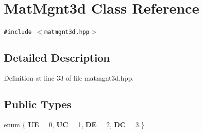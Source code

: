 \section{Mat\-Mgnt3d Class Reference}
\label{classMatMgnt3d}
{\tt \#include $<$matmgnt3d.hpp$>$}



\subsection{Detailed Description}




Definition at line 33 of file matmgnt3d.hpp.\subsection*{Public Types}
\begin{CompactItemize}
\item 
enum \{ {\bf UE} = 0, 
{\bf UC} = 1, 
{\bf DE} = 2, 
{\bf DC} = 3
 \}
\end{CompactItemize}
